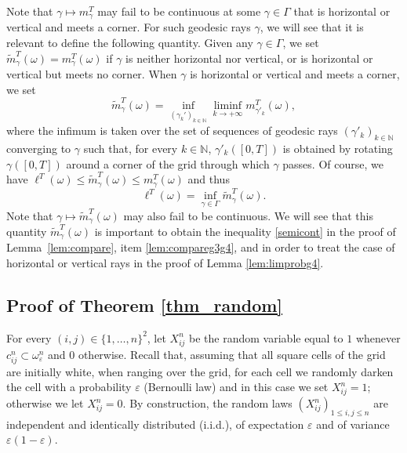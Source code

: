 \documentclass[JEP,XML,SOM,Unicode, NoEqCountersInSection,NoFloatCountersInSection,published]{cedram}
\def\N{\mathbb{N}}
\theoremstyle{definition}
\begin{document}
{
Note that $\gamma\mapsto m_\gamma^T$ may fail to be continuous at some $\gamma\in\Gamma$ that is horizontal or vertical and meets a corner. For such geodesic rays $\gamma$, we will see that it is relevant to define the following quantity. Given any $\gamma\in\Gamma$, we set $\widetilde m^T_\gamma(\omega) = m^T_\gamma(\omega)$ if $\gamma$ is neither horizontal nor vertical, or is horizontal or vertical but meets no corner. When $\gamma$ is horizontal or vertical and meets a corner, we set
\begin{equation}\label{def_tildemT}
\widetilde m^T_\gamma(\omega) = \inf_{(\gamma_k')_{k\in \N}}\liminf_{k\to +\infty} m^T_{\gamma'_k}(\omega),
\end{equation}
where the infimum is taken over the set of sequences of geodesic rays $(\gamma'_k)_{k\in\N}$ converging to $\gamma$ such that, for every $k\in\N$, $\gamma'_k([0,T])$ is obtained by rotating $\gamma([0,T])$ around a corner of the grid through which $\gamma$ passes.
Of course, we have $\ell^T(\omega) \leq \widetilde m^T_\gamma(\omega) \leq m^T_\gamma(\omega)$ and thus
\begin{equation*}
\ell^T(\omega) = \inf_{\gamma \in \Gamma} \widetilde m^T_\gamma(\omega).
\end{equation*}
Note that $\gamma\mapsto \widetilde m^T_\gamma(\omega)$ may also fail to be continuous.
We will see that this quantity $\widetilde m^T_\gamma(\omega)$ is important to obtain the inequality \eqref{semicont} in the proof of Lemma~\ref{lem:compare}, item \eqref{lem:compareg3g4}, and in order to treat the case of horizontal or vertical rays in the proof of Lemma \ref{lem:limprobg4}.
}

\subsection{Proof of Theorem \ref{thm_random}}\label{sec:sketch}
For every $(i,j)\in \{1,\ldots,n\}^2$, let $X_{ij}^n$ be the random variable equal to $1$ whenever $c_{ij}^n\subset\omega_\varepsilon^n$ and $0$ otherwise.
Recall that, assuming that all square cells of the grid are initially white, when ranging over the grid, for each cell we randomly darken the cell with a probability $\varepsilon$ (Bernoulli law) and in this case we set $X_{ij}^n=1$; otherwise we let $X_{ij}^n=0$.
By construction, the random laws $(X_{ij}^n)_{1\leq i,j\leq n}$ are independent and identically distributed (i.i.d.), of expectation $\varepsilon$ and of variance $\varepsilon(1-\varepsilon)$.
\end{document}
